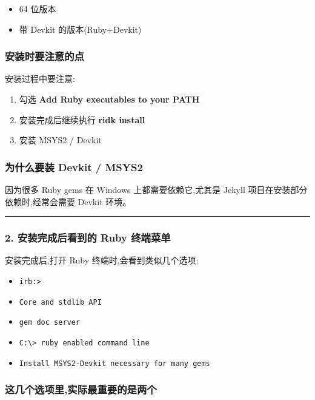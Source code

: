 \documentclass[lang=cn,scheme=chinese,color=blue,device=normal,toc=onecol,math=cm]{elegantbook}
\begin{document}
\begin{itemize}
\item 64 位版本
\item 带 Devkit 的版本(Ruby+Devkit)
\end{itemize}


\subsubsection{安装时要注意的点}


安装过程中要注意:\par


\begin{enumerate}
\item 勾选 \textbf{Add Ruby executables to your PATH}
\item 安装完成后继续执行 \textbf{ridk install}
\item 安装 MSYS2 /\allowbreak{} Devkit
\end{enumerate}


\subsubsection{为什么要装 Devkit /\allowbreak{} MSYS2}


因为很多 Ruby gems 在 Windows 上都需要依赖它,尤其是 Jekyll 项目在安装部分依赖时,经常会需要 Devkit 环境。\par


\medskip\hrule\medskip


\subsubsection{2. 安装完成后看到的 Ruby 终端菜单}


安装完成后,打开 Ruby 终端时,会看到类似几个选项:\par


\begin{itemize}
\item \texttt{irb:>}
\item \texttt{Core and stdlib API}
\item \texttt{gem doc server}
\item \texttt{C:\textbackslash{}\allowbreak{}> ruby enabled command line}
\item \texttt{Install MSYS2-Devkit necessary for many gems}
\end{itemize}


\subsubsection{这几个选项里,实际最重要的是两个}
\end{document}
